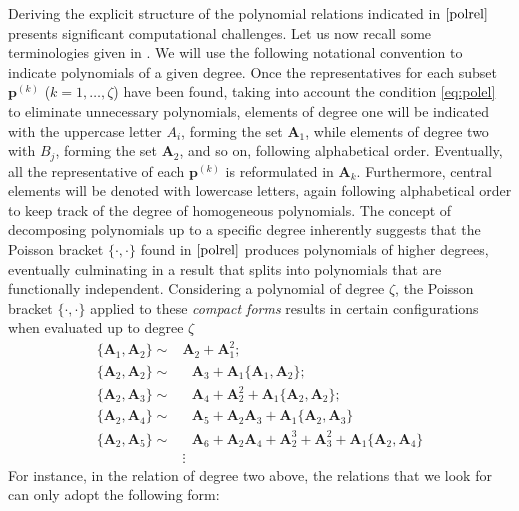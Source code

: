 \documentclass[10pt]{amsart}
\theoremstyle{definition}
\theoremstyle{corollary}
\theoremstyle{remark}
\theoremstyle{conclusion}
\begin{document}
  


\medskip
 
Deriving the explicit structure of the polynomial relations indicated in $\eqref{polrel}$ presents significant computational challenges. Let us now recall some  terminologies given in \cite{MR4660510}.   We will use the following notational convention to indicate polynomials of a given degree. Once the representatives for each subset $\boldsymbol{p}^{(k)}$ ($k=1, \dots, \zeta$) have been found, taking into account the condition \eqref{eq:polel} to eliminate unnecessary polynomials, elements of degree one will be indicated with the uppercase letter $A_i$, forming the set $\textbf{A}_1$, while elements of degree two with $B_j$,  forming the set $\textbf{A}_2$,  and so on, following alphabetical order. Eventually, all the representative of each $\boldsymbol{p}^{(k)}$ is reformulated in $\textbf{A}_k.$ Furthermore, central elements will be denoted with lowercase letters, again following alphabetical order to keep track of the degree of homogeneous polynomials.  The concept of decomposing polynomials up to a specific degree inherently suggests that the Poisson bracket $\{\cdot,\cdot\}$ found in $\eqref{polrel}$ produces polynomials of higher degrees, eventually culminating in a result that splits into polynomials that are functionally independent.  Considering a polynomial of degree $\zeta$, the Poisson bracket $\{\cdot,\cdot\}$ applied to these \textit{compact forms} results in certain configurations when evaluated up to degree $\zeta$ \begin{align}
\nonumber
    \{\textbf{A}_1,\textbf{A}_2\} \sim &  \textbf{A}_2 + \textbf{A}_1^2; \\
    \nonumber
    \{\textbf{A}_2,\textbf{A}_2\} \sim & \text{ } \textbf{A}_3 + \textbf{A}_1 \{\textbf{A}_1,\textbf{A}_2\}; \\
      \{\textbf{A}_2,\textbf{A}_3\} \sim & \text{ } \textbf{A}_4 +  \textbf{A}_2^2 + \textbf{A}_1 \{\textbf{A}_2,\textbf{A}_2\}; \label{eq:compact} \\
      \nonumber
       \{\textbf{A}_2,\textbf{A}_4\} \sim & \text{ } \textbf{A}_5 +  \textbf{A}_2 \textbf{A}_3 + \textbf{A}_1 \{\textbf{A}_2,\textbf{A}_3\}\\ 
       \nonumber
       \{\textbf{A}_2,\textbf{A}_5\} \sim & \text{ } \textbf{A}_6 + \textbf{A}_2 \textbf{A}_4 +  \textbf{A}_2^3 +  \textbf{A}_3^2 + \textbf{A}_1 \{\textbf{A}_2,\textbf{A}_4\} \\
       & \vdots  \nonumber
\end{align} For instance, in the relation of degree two above, the relations that we look for can only adopt the following form: \begin{align}

\end{align}
\end{document}
